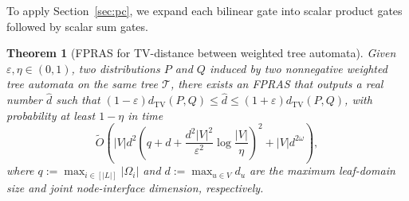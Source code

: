 \documentclass{article}
\newtheorem{theorem}{Theorem}[section]
\begin{document}
To apply Section~\ref{sec:pc}, we expand each bilinear gate into scalar product gates followed by scalar sum gates.

\begin{theorem}[FPRAS for TV-distance between weighted tree automata]\label{thm:wta_fpras}
Given $\varepsilon,\eta\in(0,1)$, two distributions $P$ and $Q$ induced by two nonnegative weighted tree automata on the same tree $\mathcal{T}$, there exists an FPRAS that outputs a real number $\widehat d$ such that
$(1-\varepsilon)d_{\mathrm{TV}}(P,Q)\leq\widehat d\leq(1+\varepsilon)d_{\mathrm{TV}}(P,Q)$, with probability at least $1-\eta$ in time
$$
\widetilde{O}\!\left(|V|d^2\left(q+d+\frac{d^2|V|^2}{\varepsilon^2}\log\frac{|V|}{\eta}\right)^2+|V|d^{2\omega}\right),
$$
where $q:=\max_{i\in[|L|]}|\Omega_i|$ and $d:=\max_{u\in V} d_u$ are the maximum leaf-domain size and joint node-interface dimension, respectively.
\end{theorem}
\end{document}
